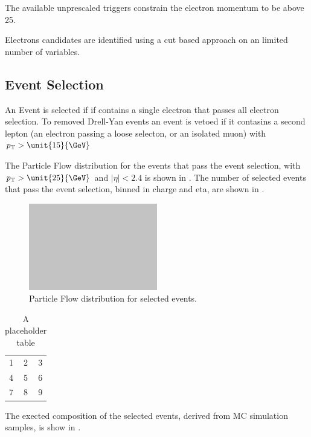 The available unprescaled triggers constrain the electron momentum to be above
\unit{25}{\GeV}.

Electrons candidates are identified using a cut based approach on an limited
number of variables.


\subsection{Event Selection}

An Event is selected if if contains a single electron that passes all electron
selection.
To removed Drell-Yan events an event is vetoed if it contasins a second lepton
(an electron passing a loose selecton, or an isolated muon) with $\pt > 
\unit{15}{\GeV}$

The Particle Flow \ETm distribution for the events that pass the event
selection, with $\pt > \unit{25}{\GeV}$ and $|\eta| < 2.4$ is shown in
.
The number of selected events that pass the event selection, binned in charge 
and eta, are shown in . 

\begin{figure}[htb]
  \caption{Particle Flow \ETm distribution for selected events.}
  \label{asym36:pfmet}
  \centering
  \includegraphics[width=0.5\textwidth]{placeholder}
\end{figure}

\begin{table}[htb]
  \caption{A placeholder table}
  \label{asym36:selectedevents}
  \centering
  \begin{tabular}{| l c r |}
    \hline
    1 & 2 & 3 \\
    4 & 5 & 6 \\
    7 & 8 & 9 \\
  \hline
  \end{tabular}
\end{table}
                           
The exected composition of the selected events, derived from MC simulation
samples, is show in . 

